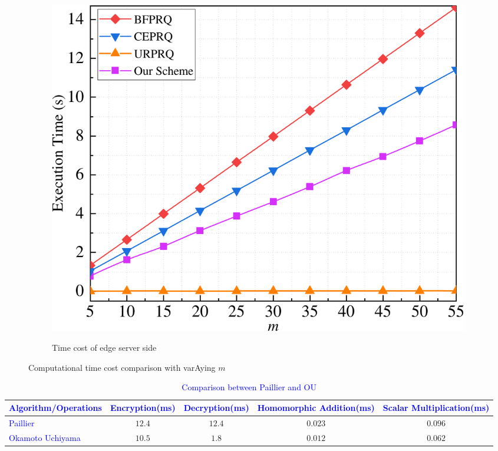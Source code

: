 \documentclass[IEEE JOURNAL OF BIOMEDICAL AND HEALTH INFORMATICS]{IEEEtran}
\begin{document}
{\begin{figure}
\begin{subfigure}[t]{0.3\textwidth}
		\centering
		\includegraphics[width=1\textwidth]{com_3m}\\
		\caption{Time cost of edge server side}\label{com_3m}
	\end{subfigure}
	\caption{Computational time cost comparison with varAying $m$}\label{computation_m}
\end{figure}


\vspace{-0cm}
\begin{table}\centering
	
	\caption{\textcolor{blue}{Comparison between Paillier and OU}}
	
	\begin{tabular*}{15cm}{p{3.0cm}cccc}
		
		\hline
		\textcolor{blue}{Algorithm/Operations} & \textcolor{blue}{Encryption(ms)} & \textcolor{blue}{Decryption(ms)} & \textcolor{blue}{Homomorphic Addition(ms)} & \textcolor{blue}{Scalar Multiplication(ms)} \\
		\hline
		\textcolor{blue}{Paillier}            & $12.4$     & $12.4$    & $0.023$    & $0.096$ \\
		\textcolor{blue}{Okamoto Uchiyama}    & $10.5$     & $1.8$  & $0.012$  & $0.062$ \\\hline
	\end{tabular*}
	\label{encryption}
\end{table}



\begin{table}\centering
	

\end{table}}
\end{document}
